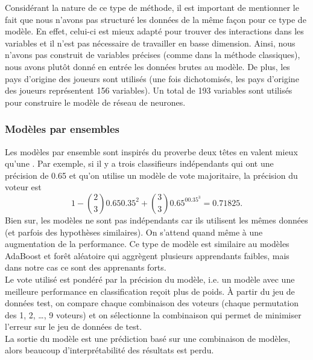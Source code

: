 Considérant la nature de ce type de méthode, il est important de mentionner le fait que nous n'avons pas structuré les données de la même façon pour ce type de modèle. En effet, celui-ci est mieux adapté pour trouver des interactions dans les variables et il n'est pas nécessaire de travailler en basse dimension. Ainsi, nous n'avons pas construit de variables précises (comme dans la méthode classiques), nous avons plutôt donné en entrée les données brutes au modèle. De plus, les pays d'origine des joueurs sont utilisés (une fois dichotomisés, les pays d'origine des joueurs représentent 156 variables). Un total de 193 variables sont utilisés pour construire le modèle de réseau de neurones.

\subsubsection{Modèles par ensembles}

Les modèles par ensemble sont inspirés du proverbe \guillemotleft deux têtes en valent mieux qu'une \guillemotright. Par exemple, si il y a trois classifieurs indépendants qui ont une précision de 0.65 et qu'on utilise un modèle de vote majoritaire, la précision du voteur est 
$$1 - \binom{2}{3}0.650.35^2 + \binom{3}{3}0.65^00.35^3 = 0.71825.$$
Bien sur, les modèles ne sont pas indépendants car ils utilisent les mêmes données (et parfois des hypothèses similaires). On s'attend quand même à une augmentation de la performance. Ce type de modèle est similaire au modèles AdaBoost et forêt aléatoire qui aggrègent plusieurs apprendants faibles, mais dans notre cas ce sont des apprenants forts.\\

Le vote utilisé est pondéré par la précision du modèle, i.e. un modèle avec une meilleure performance en classification reçoit plus de poids. À partir du jeu de données test, on compare chaque combinaison des voteurs (chaque permutation des 1, 2, \dots, 9 voteurs) et on sélectionne la combinaison qui permet de minimiser l'erreur sur le jeu de données de test.\\

La sortie du modèle est une prédiction basé sur une combinaison de modèles, alors beaucoup d'interprétabilité des résultats est perdu.
